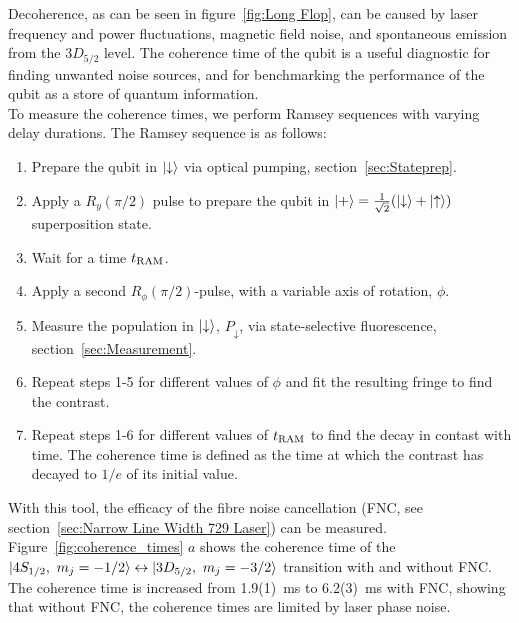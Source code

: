     Decoherence, as can be seen in figure~\ref{fig:Long Flop}, can be caused by laser frequency and power fluctuations, magnetic field noise, and spontaneous emission from the $3D_{5/2}$ level. The coherence time of the qubit is a useful diagnostic for finding unwanted noise sources, and for benchmarking the performance of the qubit as a store of quantum information.\\
    To measure the coherence times, we perform Ramsey sequences with varying delay durations. The Ramsey sequence is as follows:
    \begin{enumerate}
        \item Prepare the qubit in $\ket{\downarrow}$ via optical pumping, section~\ref{sec:Stateprep}.
        \item Apply a $R_y(\pi/2)$ pulse to prepare the qubit in $\ket{+} = \frac{1}{\sqrt{2}}(\ket{\downarrow} + \ket{\uparrow})$ superposition state.
        \item Wait for a time $t_{\rm RAM}$.
        \item Apply a second $R_\phi(\pi/2)$-pulse, with a variable axis of rotation, $\phi$. 
        \item Measure the population in $\ket{\downarrow}$, $P_\downarrow$, via state-selective fluorescence, section~\ref{sec:Measurement}.
        \item Repeat steps 1-5 for different values of $\phi$ and fit the resulting fringe to find the contrast.
        \item Repeat steps 1-6 for different values of $t_{\rm RAM}$ to find the decay in contast with time. The coherence time is defined as the time at which the contrast has decayed to $1/e$ of its initial value.
    \end{enumerate}
    With this tool, the efficacy of the fibre noise cancellation (FNC, see section~\ref{sec:Narrow Line Width 729 Laser}) can be measured. Figure~\ref{fig:coherence_times} $a$ shows the coherence time of the $\ket{4S_{1/2},~m_j=-1/2}\leftrightarrow\ket{3D_{5/2},~m_j=-3/2}$  transition with and without FNC. The coherence time is increased from 1.9(1)~\unit{\ms} to 6.2(3)~\unit{\ms} with FNC, showing that without FNC, the coherence times are limited by laser phase noise. \\
